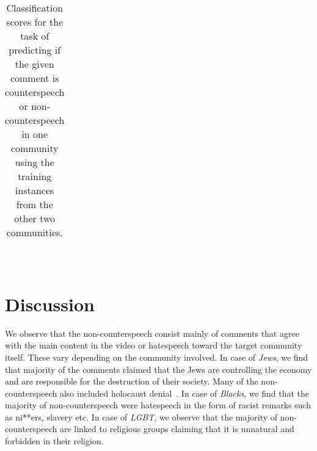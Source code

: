 \documentclass[11pt,a4paper]{article}
\begin{document}
{\begin{table}[!htbp]
{\begin{tabular}{| p{2.5cm} | p{1.7cm}| p{2cm} | p{1.5cm} |p{1.5cm}| p{1.5cm}|}
		\hline
		
	\end{tabular}}
	\caption{Classification scores for the task of predicting if the given comment is counterspeech or non-counterspeech in one community using the training instances from the other two communities.}
	~\label{tab:prediction_task3_results}
\vspace{-8mm}
\end{table}


\section{Discussion}

We observe that the non-counterspeech consist mainly of comments that agree with the main content in the video or hatespeech toward the target community itself. These vary depending on the community involved. In case of {\sl Jews}, we find that majority of the comments claimed that the Jews are controlling the economy and are responsible for the destruction of their society. Many of the non-counterspeech also included holocaust denial~\cite{gerstenfeld2003hate}. In case of {\sl Blacks}, we find that the majority of non-counterspeech were hatespeech in the form of racist remarks such as ni**ers, slavery etc. In case of {\sl LGBT}, we observe that the majority of non-counterspeech are linked to religious groups claiming that it is unnatural and forbidden in their religion.

\iffalse
Analysis of counterspeech content shows that the strategy of using `Hostile Language' is very prevalent (see Table~\ref{tab:dataset_statistics}). We observe that these type of counterspeech are not welcomed by even the target community in whose favor these are posted. In many instances, the target community users tend to oppose this form of counterspeech and request the counterspeakers to refrain from using such language of hate.
\fi


}
\end{document}
